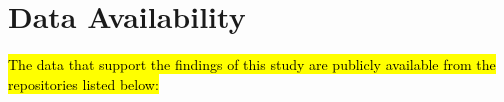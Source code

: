 \documentclass[10pt,letterpaper]{article}
\begin{document}
%
%
%
%
%




%

\section*{Data Availability}

\hl{The data that support the findings of this study are publicly available from the repositories listed below:}
\end{document}
